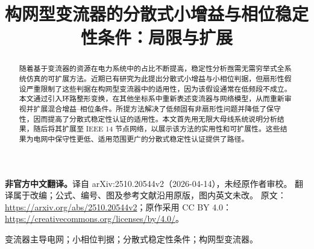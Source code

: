 \documentclass{IEEEtran4PSCC}
\begin{document}
\title{构网型变流器的分散式小增益与相位稳定性条件：局限与扩展}

\author{
}

\maketitle

\begin{center}
\footnotesize
\textbf{非官方中文翻译。}译自 arXiv:2510.20544v2（2026-04-14），未经原作者审校。
翻译属于改编；公式、编号、图及参考文献沿用原版，图内英文未改。
原文：\url{https://arxiv.org/abs/2510.20544v2}；原作采用 CC BY 4.0：
\url{https://creativecommons.org/licenses/by/4.0/}。
\end{center}

\begin{abstract}
随着基于变流器的资源在电力系统中的占比不断提高，稳定性分析亟需无需穷举式全系统仿真的可扩展方法。近期已有研究为此提出分散式小增益与小相位判据，但扇形性假设严重限制了这些判据在构网型变流器中的适用性，因为该假设通常在低频段不成立。本文通过引入环路整形变换，在其他坐标系中重新表述变流器与网络模型，从而重新审视并扩展混合增益--相位条件。所提方法解决了低频固有非扇形性问题并降低了保守性，因而提高了分散式稳定性认证的适用性。本文首先用无限大母线系统说明分析结果，随后将其扩展至 IEEE 14 节点网络，以展示该方法的实用性和可扩展性。这些结果为电网中保守性更低、适用范围更广的分散式稳定性认证提供了路径。
\end{abstract}

\begin{IEEEkeywords}
变流器主导电网；小相位判据；分散式稳定性条件；构网型变流器。
\end{IEEEkeywords}











\end{document}
